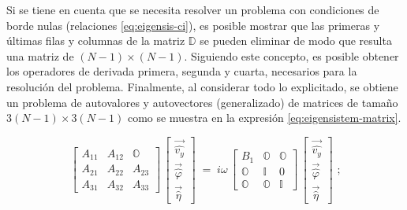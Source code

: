 Si se tiene en cuenta que se necesita resolver un problema con condiciones de borde nulas (relaciones  \ref{eq:eigensis-ci}), es posible mostrar \cite{szuban2023} que las primeras y últimas filas y columnas de la matriz $\mathbb{D}$ se pueden eliminar de modo que resulta una matriz de \linebreak $(N-1) \times (N-1)$. Siguiendo este concepto, es posible obtener los operadores de derivada primera, segunda y cuarta, necesarios para la resolución del problema. Finalmente, al considerar todo lo explicitado, se obtiene un problema de autovalores y autovectores (generalizado) de matrices de tamaño  $3(N-1) \times 3(N-1)$ como se muestra en la expresión \ref{eq:eigensistem-matrix}. 

\begin{equation}
\begin{bmatrix}
A_{11} & A_{12} & \mathbb{O} \\[4pt]
A_{21} & A_{22} & A_{23} \\[4pt]
A_{31} & A_{32} & A_{33}
\end{bmatrix}
\,\begin{bmatrix}
\vec{\widehat{v_y} } \\[4pt]
\vec{\widehat{\varphi}} \\[4pt]
\vec{\widehat{\eta}}
\end{bmatrix}
\;=\; i \omega
\,\begin{bmatrix}
  B_1 & \mathbb{O} & \mathbb{O} \\[4pt]
    \mathbb{O} & \mathbb{I} & 0 \\[4pt]
    \mathbb{O} & \mathbb{O} & \mathbb{I}
\end{bmatrix}
\,\begin{bmatrix}
\vec{\widehat{v_y}} \\[4pt]
\vec{\widehat{\varphi}} \\[4pt]
\vec{\widehat{\eta}}
\end{bmatrix} \text{ ;}
\label{eq:eigensistem-matrix}
\end{equation}

